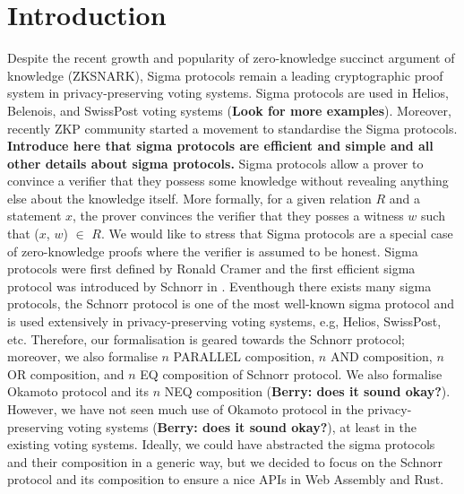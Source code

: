 \documentclass[sigconf]{acmart}
\begin{document}
\section{Introduction}
Despite the recent growth and popularity of zero-knowledge succinct 
argument of knowledge (ZKSNARK), Sigma protocols remain a
leading cryptographic proof system in privacy-preserving voting systems. 
Sigma protocols are used in Helios, Belenois, and SwissPost voting systems (\textbf{Look for more examples}). 
Moreover, recently ZKP community started a movement to standardise
the Sigma protocols. \textbf{Introduce here that sigma protocols are efficient and simple and all 
other details about sigma protocols.} Sigma protocols allow a prover to convince a verifier that 
they possess some knowledge without revealing anything else about the knowledge itself.  
More formally, for a given relation $R$ and a statement $x$, the prover convinces the verifier
that they posses a witness $w$ such that ($x$, $w$) $\in$ $R$. We would like to stress that
Sigma protocols are a special case of zero-knowledge proofs where the verifier is 
assumed to be honest. Sigma protocols were first defined by Ronald Cramer \cite{cramer1996modular} and the 
first efficient sigma protocol was introduced by Schnorr in \cite{schnorr1991efficient}. 
Eventhough there exists many sigma protocols, the Schnorr protocol is one of the most well-known
sigma protocol and is used extensively in privacy-preserving voting systems, e.g, Helios, SwissPost, etc. 
Therefore, our formalisation is geared towards the Schnorr protocol; moreover, we 
also formalise $n$ PARALLEL composition, $n$ AND composition, $n$ OR composition, 
and $n$ EQ composition of Schnorr protocol. We also formalise Okamoto protocol and 
its $n$ NEQ composition (\textbf{Berry: does it sound okay?}). However, we have not seen 
much use of Okamoto protocol in the privacy-preserving voting systems  (\textbf{Berry: does it sound okay?}), 
at least in the existing voting systems. Ideally, we could have abstracted the sigma protocols and their composition in a generic way,
but we decided to focus on the Schnorr protocol and its composition to ensure a nice APIs in 
Web Assembly and Rust.
\end{document}
